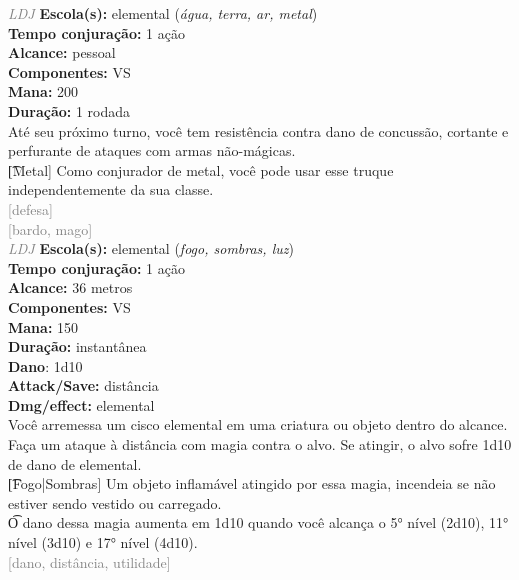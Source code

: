 \documentclass{RPG_Adventure}[2021/10/20]
\begin{document}
{\tiny \textcolor{gray}{\textit{LDJ}}}
{\small \t \textbf{Escola(s):} elemental (\textit{água, terra, ar, metal})\\\t \textbf{Tempo conjuração:} 1 ação\\\t \textbf{Alcance:} pessoal\\\t \textbf{Componentes:} VS\\\t \textbf{Mana:} 200\\\t \textbf{Duração:} 1 rodada\\}
{\normalsize Até seu próximo turno, você tem resistência contra dano de concussão, cortante e perfurante de ataques com armas não-mágicas.\\\t [Metal] Como conjurador de metal, você pode usar esse truque independentemente da sua classe.\\}
{\scriptsize \textcolor{gray}{[defesa]\\}}
{\scriptsize \textcolor{gray}{[bardo, mago]\\}}
{\tiny \textcolor{gray}{\textit{LDJ}}}
{\small \t \textbf{Escola(s):} elemental (\textit{fogo, sombras, luz})\\\t \textbf{Tempo conjuração:} 1 ação\\\t \textbf{Alcance:} 36 metros\\\t \textbf{Componentes:} VS\\\t \textbf{Mana:} 150\\\t \textbf{Duração:} instantânea\\\t \textbf{Dano}: 1d10\\\t \textbf{Attack/Save:} distância\\\t \textbf{Dmg/effect:} elemental\\}
{\normalsize Você arremessa um cisco elemental em uma criatura ou objeto dentro do alcance. Faça um ataque à distância com magia contra o alvo. Se atingir, o alvo sofre 1d10 de dano de elemental.\\\t [Fogo|Sombras] Um objeto inflamável atingido por essa magia, incendeia se não estiver sendo vestido ou carregado.\\\t O dano dessa magia aumenta em 1d10 quando você alcança o 5° nível (2d10), 11° nível (3d10) e 17° nível (4d10).\\}
{\scriptsize \textcolor{gray}{[dano, distância, utilidade]\\}}
\end{document}
